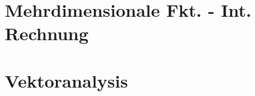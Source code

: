 \documentclass[8pt]{mpscheatsheet}
\begin{document}
     \section{Mehrdimensionale Fkt. - Int. Rechnung}
         
         
         
         
         
         
         
         
         
         
     \section{Vektoranalysis}
         
         
         
         
         
\end{document}
